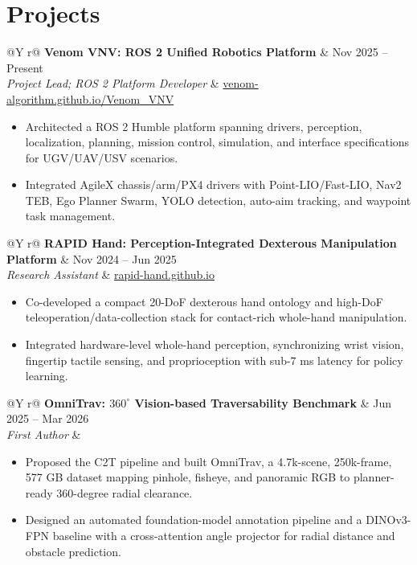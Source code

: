 \documentclass[10pt,letterpaper]{article}
\makeatletter
\newcommand{\projectentry}[4]{%
  \begin{tabularx}{\textwidth}{@{}Y r@{}}
    \textbf{#1} & #2 \\
    \textit{#3} & #4
  \end{tabularx}
}
\newenvironment{cvitems}
  {\begin{itemize}[leftmargin=1.25em,itemsep=2pt,topsep=3pt,parsep=0pt,partopsep=0pt]}
  {\end{itemize}}
\makeatother
\begin{document}
\section*{Projects}

\projectentry{Venom VNV: ROS 2 Unified Robotics Platform}
{Nov 2025 -- Present}
{Project Lead; ROS 2 Platform Developer}
{\href{https://venom-algorithm.github.io/Venom_VNV/}{venom-algorithm.github.io/Venom\_VNV}}
\begin{cvitems}
  \item Architected a ROS 2 Humble platform spanning drivers, perception, localization, planning, mission control, simulation, and interface specifications for UGV/UAV/USV scenarios.
  \item Integrated AgileX chassis/arm/PX4 drivers with Point-LIO/Fast-LIO, Nav2 TEB, Ego Planner Swarm, YOLO detection, auto-aim tracking, and waypoint task management.
\end{cvitems}

\projectentry{RAPID Hand: Perception-Integrated Dexterous Manipulation Platform}
{Nov 2024 -- Jun 2025}
{Research Assistant}
{\href{https://rapid-hand.github.io/}{rapid-hand.github.io}}
\begin{cvitems}
  \item Co-developed a compact 20-DoF dexterous hand ontology and high-DoF teleoperation/data-collection stack for contact-rich whole-hand manipulation.
  \item Integrated hardware-level whole-hand perception, synchronizing wrist vision, fingertip tactile sensing, and proprioception with sub-7 ms latency for policy learning.
\end{cvitems}

\projectentry{OmniTrav: $360^\circ$ Vision-based Traversability Benchmark}
{Jun 2025 -- Mar 2026}
{First Author}
{}
\begin{cvitems}
  \item Proposed the C2T pipeline and built OmniTrav, a 4.7k-scene, 250k-frame, 577 GB dataset mapping pinhole, fisheye, and panoramic RGB to planner-ready 360-degree radial clearance.
  \item Designed an automated foundation-model annotation pipeline and a DINOv3-FPN baseline with a cross-attention angle projector for radial distance and obstacle prediction.
\end{cvitems}
\end{document}
